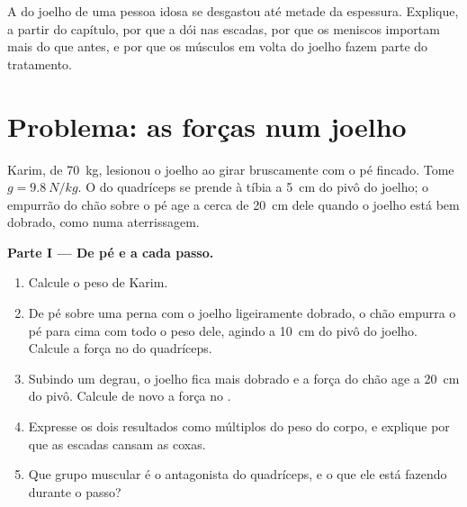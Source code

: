 \begin{exercise}[$\star\star\star$]\label{exo:g10:muscles-and-joints:15}
A  do joelho de uma pessoa idosa se desgastou até metade da
espessura. Explique, a partir do capítulo, por que a  dói
nas escadas, por que os meniscos importam mais do que antes, e por que
os músculos em volta do joelho fazem parte do tratamento.
\end{exercise}

\section{Problema: as forças num joelho}

\begin{problem}
\label{pb:g10:muscles-and-joints:1}
Karim, de \qty{70}{kg}, lesionou o joelho ao girar bruscamente com o pé
fincado. Tome $g = \qty{9.8}{N/kg}$. O  do quadríceps se prende à
tíbia a \qty{5}{cm} do pivô do joelho; o empurrão do chão sobre o pé
age a cerca de \qty{20}{cm} dele quando o joelho está bem dobrado, como
numa aterrissagem.

\medskip
\noindent\textbf{Parte I --- De pé e a cada passo.}
\begin{enumerate}
  \item Calcule o peso de Karim.
  \item De pé sobre uma perna com o joelho ligeiramente dobrado, o
        chão empurra o pé para cima com todo o peso dele, agindo a
        \qty{10}{cm} do pivô do joelho. Calcule a força no  do
        quadríceps.
  \item Subindo um degrau, o joelho fica mais dobrado e a força do chão
        age a \qty{20}{cm} do pivô. Calcule de novo a força no .
  \item Expresse os dois resultados como múltiplos do peso do corpo, e
        explique por que as escadas cansam as coxas.
  \item Que grupo muscular é o antagonista do quadríceps, e o que ele
        está fazendo durante o passo?
\end{enumerate}


\end{problem}
